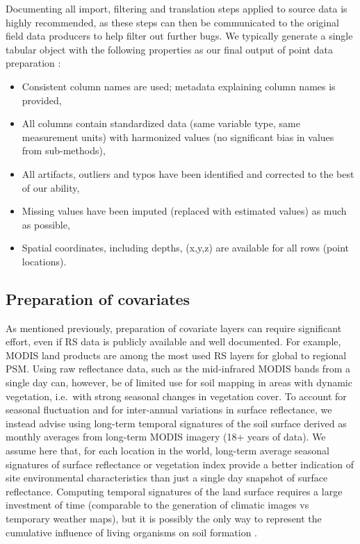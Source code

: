 \documentclass[graybox,natbib,nospthms,UStrade]{svmono}
\begin{document}
Documenting all import, filtering and translation steps applied to
source data is highly recommended, as these steps can then be
communicated to the original field data producers to help filter out
further bugs. We typically generate a single tabular object with the
following properties as our final output of point data preparation :

\begin{itemize}
\item
  Consistent column names are used; metadata explaining column names
  is provided,
\item
  All columns contain standardized data (same variable type, same
  measurement units) with harmonized values (no significant bias in
  values from sub-methods),
\item
  All artifacts, outliers and typos have been identified and corrected
  to the best of our ability,
\item
  Missing values have been imputed (replaced with estimated values) as
  much as possible,
\item
  Spatial coordinates, including depths, (x,y,z) are available for all
  rows (point locations).
\end{itemize}

\hypertarget{preparation-of-covariates}{%
\subsection{Preparation of covariates}\label{preparation-of-covariates}}

As mentioned previously, preparation of covariate layers can require
significant effort, even if RS data is publicly available and well
documented. For example, MODIS land products are among the most used RS
layers for global to regional PSM. Using raw reflectance data, such as
the mid-infrared MODIS bands from a single day can, however, be of
limited use for soil mapping in areas with dynamic vegetation, i.e.~with
strong seasonal changes in vegetation cover. To account for seasonal
fluctuation and for inter-annual variations in surface reflectance, we
instead advise using long-term temporal signatures of the soil surface
derived as monthly averages from long-term MODIS imagery (18+ years of
data). We assume here that, for each location in the world, long-term
average seasonal signatures of surface reflectance or vegetation index
provide a better indication of site environmental characteristics than
just a single day snapshot of surface reflectance. Computing temporal
signatures of the land surface requires a large investment of time
(comparable to the generation of climatic images vs temporary weather
maps), but it is possibly the only way to represent the cumulative
influence of living organisms on soil formation \citep{Hengl2017SoilGrids250m}.
\end{document}
